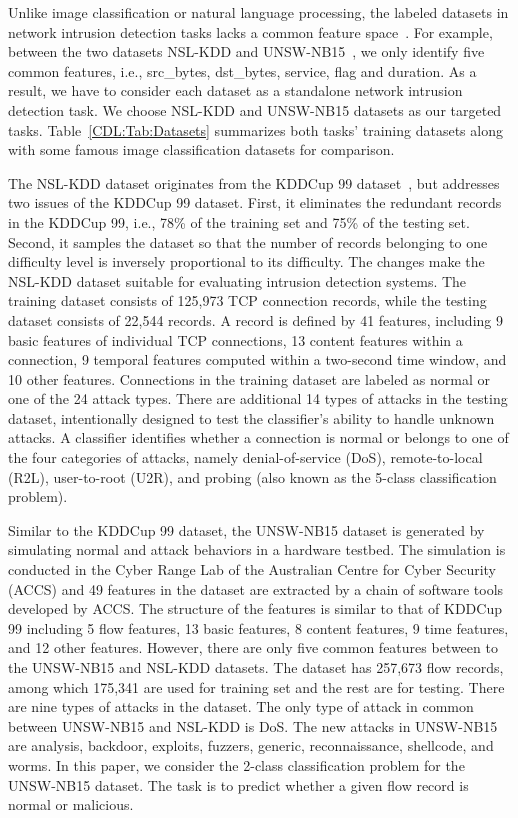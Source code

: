 
Unlike image classification or natural language processing,
the labeled datasets in network intrusion detection tasks lacks a common feature space~\cite{KDDCup, DARPA, UNSW, NSL-KDD}.
For example, between the two datasets NSL-KDD\cite{NSL-KDD} and UNSW-NB15~\cite{UNSW},
we only identify five common features, i.e., src\_bytes, dst\_bytes, service, flag and duration.
As a result, we have to consider each dataset as a standalone network intrusion detection task.
We choose NSL-KDD and UNSW-NB15 datasets as our targeted tasks.
Table~\ref{CDL:Tab:Datasets} summarizes both tasks' training datasets along with some famous image classification datasets for comparison.

The NSL-KDD dataset originates from the KDDCup 99 dataset~\cite{KDDCup},
but addresses two issues of the KDDCup 99 dataset.
First, it eliminates the redundant records in the KDDCup 99, i.e., 
78\% of the training set and 75\% of the testing set.
Second, it samples the dataset so that the number of records belonging to one difficulty level is inversely proportional to its difficulty.
The changes make the NSL-KDD dataset suitable for evaluating intrusion detection systems.
The training dataset consists of 125,973 TCP connection records, while the testing dataset consists of 22,544 records.
A record is defined by 41 features, including 9 basic features of individual TCP connections, 13 content features within a connection, 9 temporal features computed within a two-second time window, and 10 other features.
Connections in the training dataset are labeled as normal or one of the 24 attack types.
There are additional 14 types of attacks in the testing dataset, intentionally designed to test the classifier's ability to handle unknown attacks.
A classifier identifies whether a connection is normal or belongs to one of the four categories of attacks, namely denial-of-service (DoS), remote-to-local (R2L), user-to-root (U2R), and probing (also known as the 5-class classification problem).

Similar to the KDDCup 99 dataset, the UNSW-NB15 dataset is generated by simulating normal and attack behaviors in a hardware testbed.
The simulation is conducted in the Cyber Range Lab of the Australian Centre for Cyber Security (ACCS) and
49 features in the dataset are extracted by a chain of software tools developed by ACCS.
The structure of the features is similar to that of KDDCup 99 including 5 flow features, 13 basic features, 8 content features, 9 time features, and 12 other features.
However, there are only five common features between to the UNSW-NB15 and NSL-KDD datasets.
The dataset has 257,673 flow records, among which 175,341 are used for
training set and the rest are for testing.
There are nine types of attacks in the dataset.
The only type of attack in common between UNSW-NB15 and NSL-KDD is DoS.
The new attacks in UNSW-NB15 are analysis, backdoor, exploits, fuzzers, generic, reconnaissance, shellcode, and worms.
In this paper, we consider the 2-class classification problem for the UNSW-NB15 dataset. The task is to predict whether a given flow record is normal or malicious.

